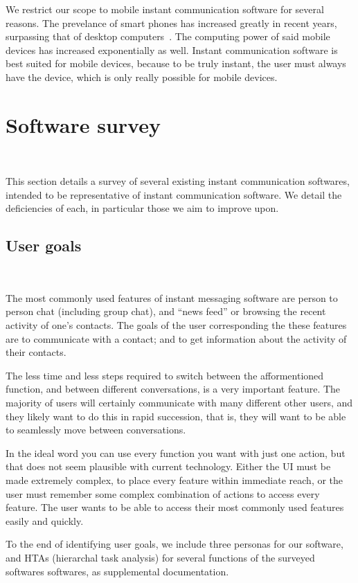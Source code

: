 \documentclass{sigchi}
\begin{document}
We restrict our scope to mobile instant communication software for several
reasons.  The prevelance of smart phones has increased greatly in recent years,
surpassing that of desktop computers~\cite{Lella:mobile_app}. The computing
power of said mobile devices has increased exponentially as well. Instant
communication software is best suited for mobile devices, because to be truly
instant, the user must always have the device, which is only really possible for
mobile devices.

\section{Software survey}~\label{sec:Survey}

This section details a survey of several existing instant communication softwares,
intended to be representative of instant communication software. We detail the 
deficiencies of each, in particular those we aim to improve upon.

\subsection{User goals}~\label{subsec:UserGoals}

The most commonly used features of instant messaging software are person to
person chat (including group chat), and ``news feed'' or browsing the recent
activity of one's contacts. The goals of the user corresponding the these
features are to communicate with a contact; and to get information about the
activity of their contacts.

The less time and less steps required to switch between the afformentioned
function, and between different conversations, is a very important feature. The
majority of users will certainly communicate with many different other users,
and they likely want to do this in rapid succession, that is, they will want to
be able to seamlessly move between conversations.

In the ideal word you can use every function you want with just one action, but
that does not seem plausible with current technology. Either the UI must be made
extremely complex, to place every feature within immediate reach, or the user
must remember some complex combination of actions to access every feature. The
user wants to be able to access their most commonly used features easily and quickly. 

To the end of identifying user goals, we include three personas for our
software, and HTAs (hierarchal task analysis) for several functions of the
surveyed softwares softwares, as supplemental documentation.
\end{document}

